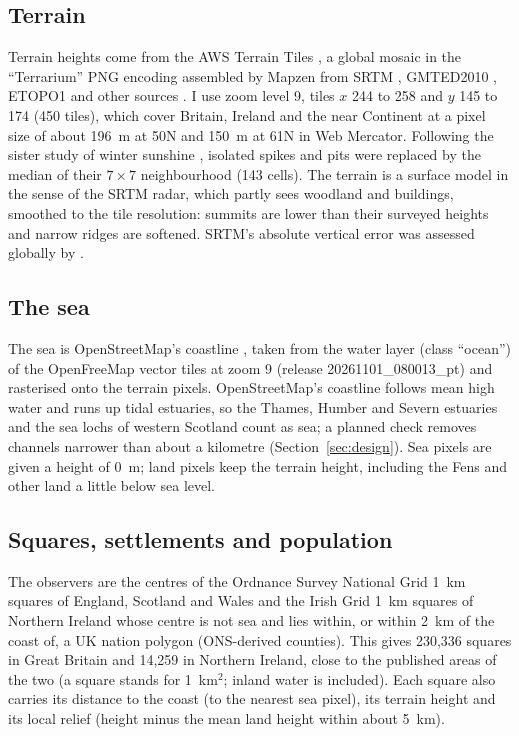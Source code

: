 \documentclass[11pt,a4paper]{article}
\begin{document}
\subsection{Terrain}
Terrain heights come from the AWS Terrain Tiles \citep{terraintiles}, a global mosaic in the ``Terrarium'' PNG encoding assembled by Mapzen from SRTM \citep{farr2007}, GMTED2010 \citep{gmted}, ETOPO1 \citep{etopo1} and other sources \citep{joerd}. I use zoom level 9, tiles $x$ 244 to 258 and $y$ 145 to 174 (450 tiles), which cover Britain, Ireland and the near Continent at a pixel size of about 196~m at 50\textdegree{}N and 150~m at 61\textdegree{}N in Web Mercator. Following the sister study of winter sunshine \citep{hotham2026sunless}, isolated spikes and pits were replaced by the median of their $7\times7$ neighbourhood (143 cells). The terrain is a surface model in the sense of the SRTM radar, which partly sees woodland and buildings, smoothed to the tile resolution: summits are lower than their surveyed heights and narrow ridges are softened. SRTM's absolute vertical error was assessed globally by \citet{rodriguez2006}.

\subsection{The sea}
The sea is OpenStreetMap's coastline \citep{osm,haklay2010}, taken from the water layer (class ``ocean'') of the OpenFreeMap vector tiles \citep{openfreemap} at zoom 9 (release 20261101\_080013\_pt) and rasterised onto the terrain pixels. OpenStreetMap's coastline follows mean high water and runs up tidal estuaries, so the Thames, Humber and Severn estuaries and the sea lochs of western Scotland count as sea; a planned check removes channels narrower than about a kilometre (Section~\ref{sec:design}). Sea pixels are given a height of 0~m; land pixels keep the terrain height, including the Fens and other land a little below sea level.

\subsection{Squares, settlements and population}
The observers are the centres of the Ordnance Survey National Grid 1~km squares of England, Scotland and Wales and the Irish Grid 1~km squares of Northern Ireland whose centre is not sea and lies within, or within 2~km of the coast of, a UK nation polygon (ONS-derived counties). This gives 230,336 squares in Great Britain and 14,259 in Northern Ireland, close to the published areas of the two (a square stands for 1~km$^2$; inland water is included). Each square also carries its distance to the coast (to the nearest sea pixel), its terrain height and its local relief (height minus the mean land height within about 5~km).
\end{document}
